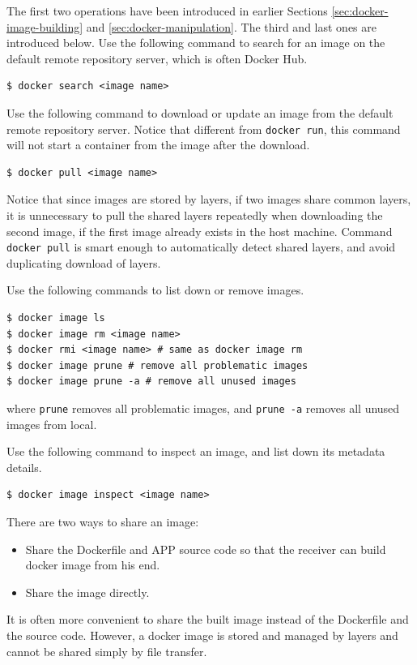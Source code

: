 The first two operations have been introduced in earlier Sections \ref{sec:docker-image-building} and \ref{sec:docker-manipulation}. The third and last ones are introduced below. Use the following command to search for an image on the default remote repository server, which is often Docker Hub.
\begin{lstlisting}
$ docker search <image name>
\end{lstlisting}
Use the following command to download or update an image from the default remote repository server. Notice that different from \verb|docker run|, this command will not start a container from the image after the download.
\begin{lstlisting}
$ docker pull <image name>
\end{lstlisting}
Notice that since images are stored by layers, if two images share common layers, it is unnecessary to pull the shared layers repeatedly when downloading the second image, if the first image already exists in the host machine. Command \verb|docker pull| is smart enough to automatically detect shared layers, and avoid duplicating download of layers.

Use the following commands to list down or remove images.
\begin{lstlisting}
$ docker image ls
$ docker image rm <image name>
$ docker rmi <image name> # same as docker image rm
$ docker image prune # remove all problematic images
$ docker image prune -a # remove all unused images
\end{lstlisting}
where \verb|prune| removes all problematic images, and \verb|prune -a| removes all unused images from local.

Use the following command to inspect an image, and list down its metadata details.
\begin{lstlisting}
$ docker image inspect <image name>
\end{lstlisting}

There are two ways to share an image:
\begin{itemize}
	\item Share the Dockerfile and APP source code so that the receiver can build docker image from his end.
	\item Share the image directly.
\end{itemize}
It is often more convenient to share the built image instead of the Dockerfile and the source code. However, a docker image is stored and managed by layers and cannot be shared simply by file transfer. 

